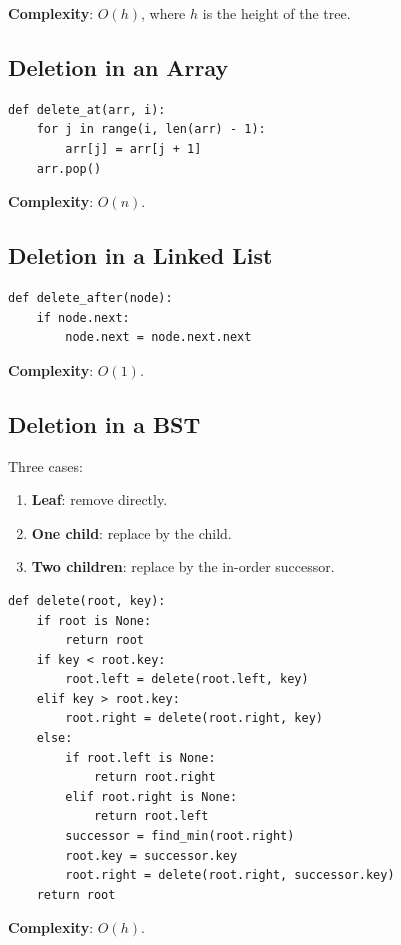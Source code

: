 \documentclass[11pt,a4paper]{article}
\begin{document}
\textbf{Complexity}: $O(h)$, where $h$ is the height of the tree.

\subsection{Deletion in an Array}

\begin{lstlisting}
def delete_at(arr, i):
    for j in range(i, len(arr) - 1):
        arr[j] = arr[j + 1]
    arr.pop()
\end{lstlisting}

\textbf{Complexity}: $O(n)$.

\subsection{Deletion in a Linked List}

\begin{lstlisting}
def delete_after(node):
    if node.next:
        node.next = node.next.next
\end{lstlisting}

\textbf{Complexity}: $O(1)$.

\subsection{Deletion in a BST}

Three cases:
\begin{enumerate}
    \item \textbf{Leaf}: remove directly.
    \item \textbf{One child}: replace by the child.
    \item \textbf{Two children}: replace by the in-order successor.
\end{enumerate}

\begin{lstlisting}
def delete(root, key):
    if root is None:
        return root
    if key < root.key:
        root.left = delete(root.left, key)
    elif key > root.key:
        root.right = delete(root.right, key)
    else:
        if root.left is None:
            return root.right
        elif root.right is None:
            return root.left
        successor = find_min(root.right)
        root.key = successor.key
        root.right = delete(root.right, successor.key)
    return root
\end{lstlisting}

\textbf{Complexity}: $O(h)$.
\end{document}
